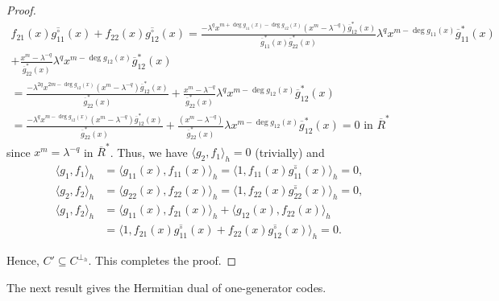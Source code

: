 \documentclass[12 pt]{extarticle}
\numberwithin{equation}{section}
\theoremstyle{definition}
\begin{document}
\begin{proof}
\begin{equation*}
\begin{split}
        f_{21}(x)\overline{g^{\circ}_{11}}(x)+f_{22}(x)\overline{g_{12}^{\circ}}(x)=\frac{-\lambda^q x^{m+\deg g_{11}(x)-\deg g_{12}(x)}(x^m-\lambda^{-q})\overline{g}^*_{12}(x)}{\overline{g}^*_{11}(x)\overline{g}^*_{22}(x)}\lambda^q x^{m-\deg g_{11}(x)}\overline{g}^*_{11}(x)\\
        + \frac{x^m-\lambda^{-q}}{\overline{g}^*_{22}(x)} \lambda^q x^{m-\deg g_{12}(x)} \overline{g}^*_{12}(x)\\
        =\frac{-\lambda^{2q} x^{2m-\deg g_{12}(x)}(x^m-\lambda^{-q})\overline{g}^*_{12}(x)}{\overline{g}^*_{22}(x)}
        + \frac{x^m-\lambda^{-q}}{\overline{g}^*_{22}(x)} \lambda^q x^{m-\deg g_{12}(x)} \overline{g}^*_{12}(x)\\
        =\frac{-\lambda^q x^{m-\deg g_{12}(x)}(x^m-\lambda^{-q})\overline{g}^*_{12}(x)}{\overline{g}^*_{22}(x)}
        + \frac{(x^m-\lambda^{-q})}{\overline{g}^*_{22}(x)} \lambda x^{m-\deg g_{12}(x)} \overline{g}^*_{12}(x)=0 \text{ in } \overline{R}^*    
    \end{split}
\end{equation*} 
since $x^m=\lambda^{-q}$ in $ \overline{R}^*$. 
Thus, we have  $\langle g_2, f_1\rangle_h=0$ (trivially)  and
\begin{equation*}
\begin{split}
        \langle g_1, f_1\rangle_h&= \langle g_{11}(x), f_{11}(x)\rangle_h= \langle 1, f_{11}(x) \overline{g_{11}^{\circ}}(x)\rangle_h=0,\\
        \langle g_2, f_2\rangle_h&= \langle g_{22}(x), f_{22}(x)\rangle_h= \langle 1, f_{22}(x) \overline{g_{22}^{\circ}}(x)\rangle_h=0,\\
       \langle g_1,f_2\rangle_h&= \langle  g_{11}(x),f_{21}(x)\rangle_h+\langle  g_{12}(x),f_{22}(x)\rangle_h\\
       &=\langle 1, f_{21}(x)\overline{g^{\circ}_{11}}(x)+f_{22}(x)\overline{g_{12}^{\circ}}(x)\rangle_h=0.
        \end{split}
    \end{equation*}

    Hence, $C'\subseteq C^{\perp_h}$. This completes the proof.
 \end{proof} 
The next result gives the Hermitian dual of one-generator codes.
\end{document}

